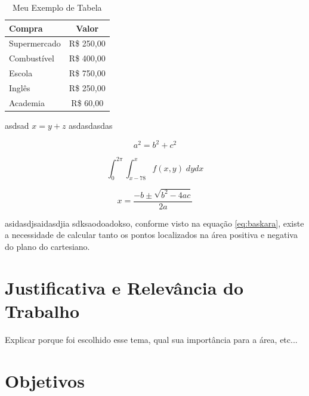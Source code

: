 \begin{table}[!htpb]
    \centering
    \begin{tabular}{||l|c||}
       \hline
       \hline
        \textbf{Compra} &  \textbf{Valor}\\
        \hline
        \hline
         Supermercado & R\$ 250,00  \\
         \hline
         Combustível & R\$ 400,00 \\
         Escola & R\$ 750,00\\
         Inglês & R\$ 250,00\\
         \hline
         Academia & R\$ 60,00\\
         \hline
         \hline
    \end{tabular}
    \caption{Meu Exemplo de Tabela}
    \label{tab:my_label}
\end{table}

asdsad $x = y + z$ asdasdasdas

\begin{equation}
    a^2 = b^2 + c^2
    \label{eq:pitagoras}
\end{equation}

\begin{equation}
    \int_0^{2\pi} \int_{x-78}^{x} f(x, y)\; dydx
\end{equation}

\begin{equation}
    x = \frac{-b\pm \sqrt{b^2-4ac}}{2a}
    \label{eq:baskara}
\end{equation}

asidasdjsaidasdjia sdksaodoadokso, conforme visto na equação \ref{eq:baskara}, existe a necessidade de calcular tanto os pontos localizados na área positiva e negativa do plano do cartesiano.

\section{Justificativa e Relevância do Trabalho}
\label{sec:justificativa}

Explicar porque foi escolhido esse tema, qual sua importância para a área, etc...


\section{Objetivos}
\label{sec:objetivo}

